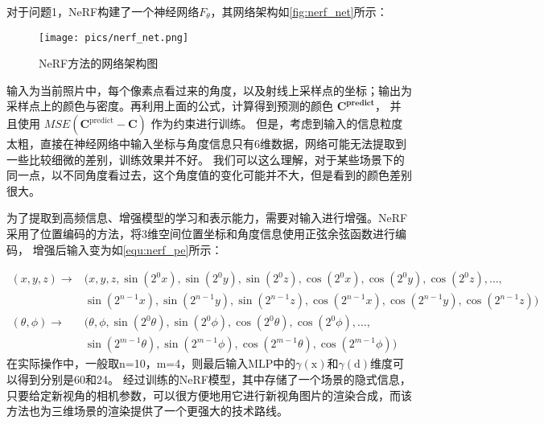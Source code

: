 \par 对于问题1，NeRF构建了一个神经网络$F_\theta$，其网络架构如\autoref{fig:nerf_net}所示：
\begin{figure}[htbp]
    \centering
    \texttt{[image: pics/nerf\_net.png]}
    \caption{\label{fig:nerf_net}NeRF方法的网络架构图~\cite{mildenhall2021nerf}}
\end{figure}




\par 输入为当前照片中，每个像素点看过来的角度，以及射线上采样点的坐标；输出为采样点上的颜色与密度。再利用上面的公式，计算得到预测的颜色 
\(\boldsymbol{C^{\text{predict}}}\)，
并且使用 $MSE(\boldsymbol{C}^{\text{predict}} - \boldsymbol{C})$ 作为约束进行训练。
但是，考虑到输入的信息粒度太粗，直接在神经网络中输入坐标与角度信息只有6维数据，网络可能无法提取到一些比较细微的差别，训练效果并不好。
我们可以这么理解，对于某些场景下的同一点，以不同角度看过去，这个角度值的变化可能并不大，但是看到的颜色差别很大。
\par 为了提取到高频信息、增强模型的学习和表示能力，需要对输入进行增强。NeRF采用了位置编码的方法，将3维空间位置坐标和角度信息使用正弦余弦函数进行编码，
增强后输入变为如\autoref{equ:nerf_pe}所示：

\begin{equation}
    \label{equ:nerf_pe}
    \begin{aligned}
        (x,y,z) \to & (x,y,z, \sin(2^0 x), \sin(2^0 y), \sin(2^0 z), \cos(2^0 x), \cos(2^0 y), \cos(2^0 z), \ldots, \\
                    & \sin(2^{n-1} x), \sin(2^{n-1} y), \sin(2^{n-1} z), \cos(2^{n-1} x), \cos(2^{n-1} y), \cos(2^{n-1} z)) \\
        (\theta,\phi) \to & (\theta,\phi, \sin(2^0 \theta), \sin(2^0 \phi), \cos(2^0 \theta), \cos(2^0 \phi), \ldots, \\
                          & \sin(2^{m-1} \theta), \sin(2^{m-1} \phi), \cos(2^{m-1} \theta), \cos(2^{m-1} \phi))
    \end{aligned}
\end{equation}
在实际操作中，一般取n=10，m=4，则最后输入MLP中的\(\gamma(\mathrm{x})\)和\(\gamma(\mathrm{d})\)维度可以得到分别是60和24。
	经过训练的NeRF模型，其中存储了一个场景的隐式信息，只要给定新视角的相机参数，可以很方便地用它进行新视角图片的渲染合成，而该方法也为三维场景的渲染提供了一个更强大的技术路线。


